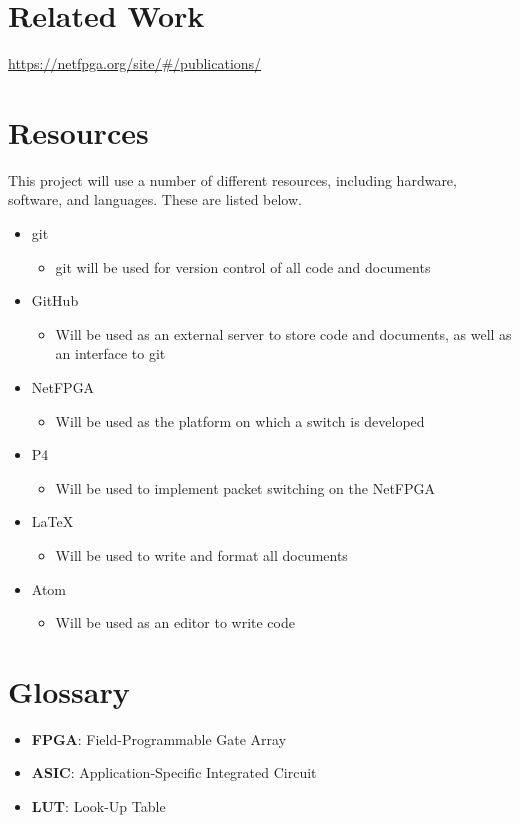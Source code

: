 \documentclass[12pt, a4paper, twoside, onecolumn]{article}
\begin{document}
\section{Related Work}
\label{related_work}
\url{https://netfpga.org/site/#/publications/}

\section{Resources}
\label{resources}
This project will use a number of different resources, including hardware, software, and languages. These are listed below.
\begin{itemize}
  \item git \cite{git}
    \begin{itemize}
      \item git will be used for version control of all code and documents
    \end{itemize}
  \item GitHub \cite{github}
    \begin{itemize}
      \item Will be used as an external server to store code and documents, as well as an interface to git
    \end{itemize}
  \item NetFPGA \cite{NetFPGA}
    \begin{itemize}
      \item Will be used as the platform on which a switch is developed
    \end{itemize}
  \item P4 \cite{P4}
    \begin{itemize}
      \item Will be used to implement packet switching on the NetFPGA
    \end{itemize}
  \item LaTeX \cite{latex}
    \begin{itemize}
      \item Will be used to write and format all documents
    \end{itemize}
  \item Atom \cite{atom}
    \begin{itemize}
      \item Will be used as an editor to write code
    \end{itemize}
\end{itemize}

\section{Glossary}
\label{glossary}
\begin{itemize}
  \item \textbf{FPGA}: Field-Programmable Gate Array
  \item \textbf{ASIC}: Application-Specific Integrated Circuit
  \item \textbf{LUT}: Look-Up Table
\end{itemize}




\end{document}
